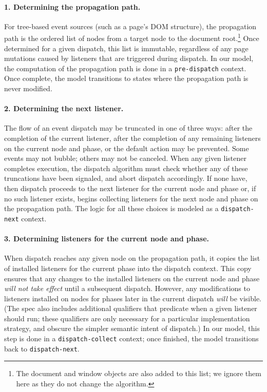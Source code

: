 \documentclass[letterpaper,10pt,twocolumn]{article}
\newcommand{\quot}{\mbox{\tt\char'042}}
\newcommand{\wild}{\mbox{\tt\char'137}}
\newcommand{\impl}[1]{{\def\_{\wild}\def\"{\quot}\tt#1}}
\begin{document}
\paragraph{1. Determining the propagation path.} For tree-based event
sources (such as a page's DOM structure), the propagation path is the
ordered list of nodes from a target node to the document
root.\footnote{The document and window objects are also added to this
  list; we ignore them here as they do not change the algorithm.}
Once determined for a given dispatch, this list is immutable,
regardless of any page mutations caused by listeners that are
triggered during dispatch.  In our model, the computation of the
propagation path is done in a \impl{pre-dispatch} context.  Once
complete, the model transitions to states where the propagation path
is never modified. 

\paragraph{2. Determining the next listener.}  The flow of an event
dispatch may be truncated in one of three ways: after the completion
of the current listener, after the completion of any remaining
listeners on the current node and phase, or the default action may be
prevented.  Some events may not bubble; others may not be canceled.
When any given listener completes execution, the dispatch algorithm
must check whether any of these truncations have been signaled, and
abort dispatch accordingly.  If none have, then dispatch proceeds to
the next listener for the current node and phase or, if no such
listener exists, begins collecting listeners for the next node and
phase on the propagation path.  The logic for all these choices is
modeled as a \impl{dispatch-next} context.

\paragraph{3. Determining listeners for the current node and phase.}
When dispatch reaches any given node on the propagation path, it
copies the list of installed listeners for the current phase into the
dispatch context.  This copy ensures that any changes to the installed
listeners on the current node and phase \emph{will not take effect}
until a subsequent dispatch.  However, any modifications to listeners
installed on nodes for phases later in the current dispatch
\emph{will} be visible.  (The spec also includes additional qualifiers
that predicate when a given listener should run; these qualifiers are
only necessary for a particular implementation strategy, and obscure
the simpler semantic intent of dispatch.)  In our model, this step is
done in a \impl{dispatch-collect} context; once finished, the model
transitions back to \impl{dispatch-next}.
\end{document}
